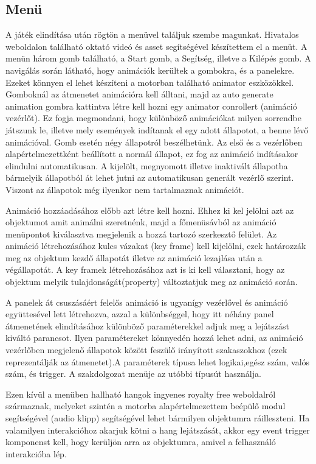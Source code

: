\documentclass[colorlinks]{thesis-ekf}
\theoremstyle{definition}
\theoremstyle{remark}
\begin{document}
\subsection{Menü}
A játék elindítása után rögtön a menüvel találjuk szembe magunkat. Hivatalos weboldalon található oktató videó és asset segítségével készítettem el a menüt. \cite{unity_ui}
A menün három gomb található, a Start gomb, a Segítség, illetve a Kilépés gomb.
A navigálás során látható, hogy animációk kerültek a gombokra, és a panelekre. Ezeket könnyen el lehet készíteni a motorban található animator eszközökkel. Gomboknál az átmenetet animációra kell álltani, majd az auto generate animation gombra kattintva létre kell hozni egy animator conrollert (animáció vezérlőt). Ez fogja megmondani, hogy különböző animációkat milyen sorrendbe játszunk le, illetve mely események indítanak el egy adott állapotot, a benne lévő animációval. Gomb esetén négy állapotról beszélhetünk. Az első és a vezérlőben alapértelmezettként beállított a normál állapot, ez fog az animáció indításakor elindulni automatikusan. A kijelölt, megnyomott illetve inaktivált állapotba bármelyik állapotból át lehet jutni az automatikusan generált vezérlő szerint. Viszont az állapotok még ilyenkor nem tartalmaznak animációt.\cite{unity_link_polish_main}

Animáció hozzáadásához előbb azt létre kell hozni. Ehhez ki kel jelölni azt az objektumot amit animálni szeretnénk, majd a főmenüsávból az animáció menüpontot kiválasztva megjelenik a hozzá tartozó szerkesztő felület. Az animáció létrehozásához kulcs vázakat (key frame) kell kijelölni, ezek határozzák meg az objektum kezdő állapotát illetve az animáció lezajlása után a végállapotát. A key framek létrehozásához azt is ki kell választani, hogy az objektum melyik tulajdonságát(property) változtatjuk meg az animáció során. \cite{unity_link_polish_main}

A panelek át csuszásáért felelős animáció is ugyanígy vezérlővel és animáció együttesével lett létrehozva, azzal a különbséggel, hogy itt néhány panel átmenetének elindításához különböző paraméterekkel adjuk meg a lejátszást kiváltó parancsot. Ilyen paramétereket könnyedén hozzá lehet adni, az animáció vezérlőben megjelenő állapotok között feszülő irányított szakaszokhoz (ezek reprezentálják az átmenetet).A paraméterek típusa lehet logikai,egész szám, valós szám, és trigger. A szakdolgozat menüje az utóbbi típusút használja.\cite{unity_link_polish_main}

Ezen kívül a menüben hallható hangok ingyenes royalty free weboldalról származnak\cite{hangforrás_link}, melyeket szintén a motorba alapértelmezettem beépülő modul segítségével (audio klipp) segítségével lehet bármilyen objektumra ráilleszteni. Ha valamilyen interakcióhoz akarjuk kötni a hang lejátszását, akkor egy event trigger komponenst kell, hogy kerüljön arra az objektumra, amivel a felhasználó interakcióba lép.\cite{unity_link_polish_main}
\end{document}
